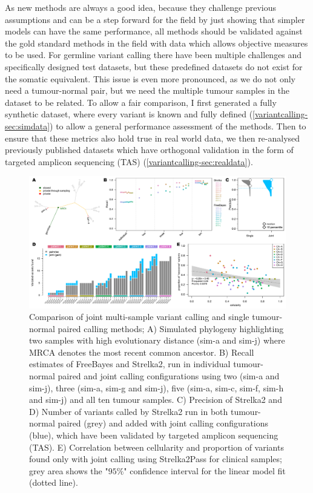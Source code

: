 As new methods are always a good idea, because they challenge previous assumptions and can be a step forward for the field by just showing that simpler models can have the same performance, all methods should be validated against the gold standard methods in the field with data which allows objective measures to be used. For germline variant calling there have been multiple challenges and specifically designed test datasets, but these predefined datasets do not exist for the somatic equivalent. This issue is even more pronounced, as we do not only need a tumour-normal pair, but we need the multiple tumour samples in the dataset to be related. To allow a fair comparison, I first generated a fully synthetic dataset, where every variant is known and fully defined (\autoref{variantcalling-sec:simdata}) to allow a general performance assessment of the methods. Then to ensure that these metrics also hold true in real world data, we then re-analysed previously published datasets which have orthogonal validation in the form of targeted amplicon sequencing (TAS) (\autoref{variantcalling-sec:realdata}).

\begin{figure}[!tpb]
\centering
  \includegraphics[width=\textwidth]{Appendices/Variantcalling/Figure_1}\vspace*{-12pt}
  \caption[Comparison of joint multi-sample and single tumour-normal paired variant calling methods]{Comparison of joint multi-sample variant calling and single tumour-normal paired calling methods; A) Simulated phylogeny highlighting two samples with high evolutionary distance (sim-a and sim-j) where MRCA denotes the most recent common ancestor. B) Recall estimates of FreeBayes and Strelka2, run in individual tumour-normal paired and joint calling configurations using two (sim-a and sim-j), three (sim-a, sim-g and sim-j), five (sim-a, sim-c, sim-f, sim-h and sim-j) and all ten tumour samples. C) Precision of Strelka2 and D) Number of variants called by Strelka2 run in both tumour-normal paired (grey) and added with joint calling configurations (blue), which have been validated by targeted amplicon sequencing (TAS). E) Correlation between cellularity and proportion of variants found only with joint calling using Strelka2Pass for clinical samples; grey area shows the "$95\%$" confidence interval for the linear model fit (dotted line).}\label{fig:varcalling:fig1}
\end{figure}

